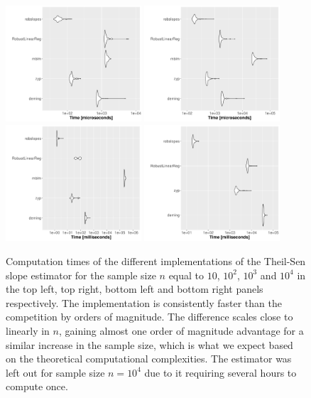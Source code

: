 \begin{figure}[h]
\includegraphics[width = 0.45\textwidth]{benchmark_TS_10.pdf}
\includegraphics[width = 0.45\textwidth]{benchmark_TS_100.pdf}
\vfill
\includegraphics[width = 0.45\textwidth]{benchmark_TS_1000.pdf}
\includegraphics[width = 0.45\textwidth]{benchmark_TS_10000.pdf}
\caption{Computation times of the different implementations of the Theil-Sen slope estimator for the sample size $n$ equal to $10$, $10^2$, $10^3$ and $10^4$ in the top left, top right, bottom left and bottom right panels respectively. The  implementation is consistently faster than the competition by orders of magnitude. The difference scales close to linearly in $n$, gaining almost one order of magnitude advantage for a similar increase in the sample size, which is what we expect based on the theoretical computational complexities. The  estimator was left out for sample size $n=10^4$ due to it requiring several hours to compute once.}
\label{fig:bench_TS}
\end{figure}



